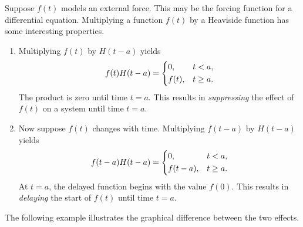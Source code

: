 \documentclass[10pt,letterpaper]{article}
\begin{document}
Suppose $f(t)$ models an external force. This may be the forcing function for a differential equation. Multiplying a function $f(t)$ by a Heaviside function has some interesting properties. 
\begin{enumerate}
\item Multiplying $f(t)$ by $H(t-a)$ yields
\[
f(t)H(t-a)=
\begin{dcases}
0, & t<a,\\
f(t), & t\ge a.
\end{dcases}
\]
The product is zero until time $t=a$. This results in \textit{suppressing} the effect of $f(t)$ on a system until time $t=a$. 

\item Now suppose $f(t)$ changes with time. Multiplying $f(t-a)$ by $H(t-a)$ yields
\[
f(t-a)H(t-a)=
\begin{dcases}
0, & t<a,\\
f(t-a), & t\ge a.
\end{dcases}
\]
At $t=a$, the delayed function begins with the value $f(0)$. This results in \textit{delaying} the start of $f(t)$ until time $t=a$. 
\end{enumerate}
The following example illustrates the graphical difference between the two effects.
\end{document}
